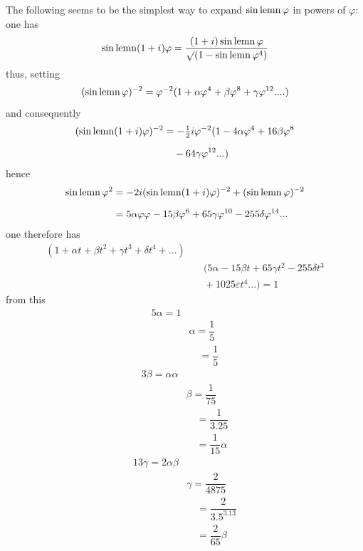 The following seems to be the simplest way to expand $\operatorname{sin\,lemn}\varphi$ in powers of $\varphi$: one has
\[
\operatorname{sin\,lemn}(1+i)\varphi=\dfrac{(1+i)\operatorname{sin\,lemn}\varphi}{\surd(1-\operatorname{sin\,lemn}\varphi^4)}
\]
thus, setting
\[
(\operatorname{sin\,lemn}\varphi)^{-2}=\varphi^{-2}(1+\alpha\varphi^4+\beta\varphi^8+\gamma\varphi^{12}\mathord{.}\mathord{.}\mathord{.}\mathord{.})
\]
and consequently
\[
\begin{aligned}(\operatorname{sin\,lemn}(1+i)\varphi)^{-2}&=-\tfrac12i\varphi^{-2}(1-4\alpha\varphi^4+16\beta\varphi^8\\[6pt]&\quad{}-64\gamma\varphi^{12}\mathord{.}\mathord{.}\mathord{.})\end{aligned}
\]
hence
\[
\begin{aligned}
\operatorname{sin\,lemn}\varphi^2&=-2i(\operatorname{sin\,lemn}(1+i)\varphi)^{-2}+(\operatorname{sin\,lemn}\varphi)^{-2}\\[6pt]
&=5\alpha\varphi\varphi-15\beta\varphi^6+65\gamma\varphi^{10}-255\delta\varphi^{14}\mathord{.}\mathord{.}\mathord{.}
\end{aligned}
\]
one therefore has
\[
\begin{aligned}(1+\alpha t+\beta t^2+\gamma t^3+\delta t^4+\mathord{.}\mathord{.}\mathord{.})\\[6pt]&\quad(5\alpha-15\beta t+65\gamma t^2-255\delta t^3\\[5pt]&\quad{}+1025\varepsilon t^4\mathord{.}\mathord{.}\mathord{.})=1\end{aligned}
\]
from this
\[
\begin{aligned}5\alpha=1\\[5pt]&\alpha=\dfrac15\\[5pt]&\quad=\dfrac15\end{aligned}
\]
\[
\begin{aligned}3\beta=\alpha\alpha\\[5pt]&\beta=\dfrac1{75}\\[5pt]&\quad=\dfrac1{3.25}\\[5pt]&\quad=\dfrac1{15}\alpha\end{aligned}
\]
\[
\begin{aligned}13\gamma=2\alpha\beta\\[5pt]&\gamma=\dfrac2{4875}\\[5pt]&\quad=\dfrac2{3.5^3.13}\\[5pt]&\quad=\dfrac2{65}\beta\end{aligned}
\]
